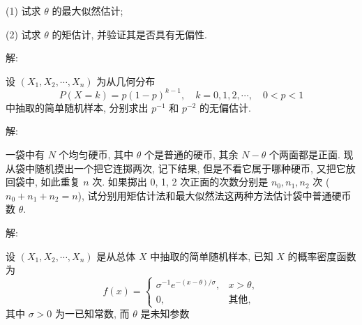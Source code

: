 \documentclass[standard]{ExBook}
\begin{document}
\begin{qitems}
\begin{bbox}
\begin{shaded}
(1) 试求 \(\theta\) 的最大似然估计;

(2) 试求 \(\theta\) 的矩估计, 并验证其是否具有无偏性.
    \end{shaded}
    \end{bbox}

\vspace{-5em}

    \begin{bbox}
解: 
    \end{bbox}

\vspace{-5em}

    \begin{bbox}
    \begin{shaded}
        \qitem
设 \((X_1, X_2, \cdots, X_n)\) 为从几何分布  
\[P(X = k) = p(1 - p)^{k-1}, \quad k = 0, 1, 2, \cdots, \quad 0 < p < 1\]
中抽取的简单随机样本, 分别求出 \( p^{-1} \) 和 \( p^{-2} \) 的无偏估计.
    \end{shaded}
    \end{bbox}

\vspace{-5em}

    \begin{bbox}
解: 
    \end{bbox}

\vspace{-5em}

    \begin{bbox}
    \begin{shaded}
        \qitem
一袋中有 \( N \) 个均匀硬币, 其中 \( \theta \) 个是普通的硬币, 其余 \( N - \theta \) 个两面都是正面. 现从袋中随机摸出一个把它连掷两次, 记下结果, 但是不看它属于哪种硬币, 又把它放回袋中, 如此重复 \( n \) 次. 如果掷出 0, 1, 2 次正面的次数分别是 \( n_0, n_1, n_2 \) 次 (\( n_0 + n_1 + n_2 = n \)), 试分别用矩估计法和最大似然法这两种方法估计袋中普通硬币数 \( \theta \).
    \end{shaded}
    \end{bbox}

\vspace{-5em}

    \begin{bbox}
解: 
    \end{bbox}

\vspace{-5em}

    \begin{bbox}
    \begin{shaded}
        \qitem
设 \( (X_1, X_2, \cdots, X_n) \) 是从总体 \( X \) 中抽取的简单随机样本, 已知 \( X \) 的概率密度函数为
\[f(x) =
\begin{cases}
\sigma^{-1} e^{-(x-\theta)/\sigma}, & x > \theta, \\
0, & \text{其他},
\end{cases}\]
其中 \( \sigma > 0 \) 为一已知常数, 而 \( \theta \) 是未知参数


\end{shaded}
\end{bbox}
\end{qitems}
\end{document}
